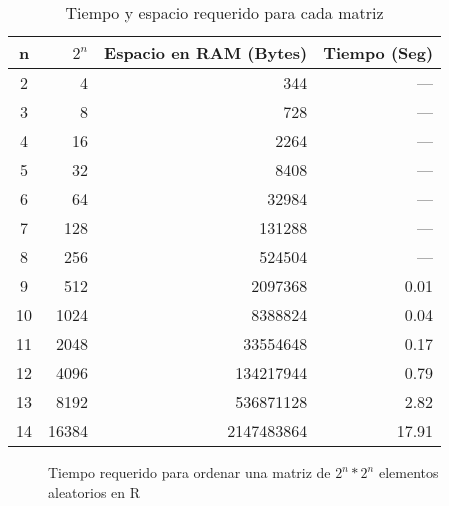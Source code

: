 \documentclass{article}
\begin{document}
\begin{table}[h]
\centering
\caption{Tiempo y espacio requerido para cada matriz}
\label{tabla 1}
\begin{tabular}{|c|r|r|r|}
\hline
n  & $2^n$ & Espacio en RAM (Bytes) & Tiempo (Seg) \\ \hline
2  & 4                    & 344                    & ---            \\ \hline
3  & 8                    & 728                    & ---            \\ \hline
4  & 16                   & 2264                   & ---            \\ \hline
5  & 32                   & 8408                   & ---            \\ \hline
6  & 64                   & 32984                  & ---            \\ \hline
7  & 128                  & 131288                 & ---            \\ \hline
8  & 256                  & 524504                 & ---            \\ \hline
9  & 512                  & 2097368                & 0.01         \\ \hline
10 & 1024                 & 8388824                & 0.04         \\ \hline
11 & 2048                 & 33554648               & 0.17         \\ \hline
12 & 4096                 & 134217944              & 0.79         \\ \hline
13 & 8192                 & 536871128              & 2.82         \\ \hline
14 & 16384                & 2147483864             & 17.91        \\ \hline
\end{tabular}

\end{table}
\begin{figure}
    \centering 
{}
\caption{Tiempo requerido para ordenar una matriz de $2^n * 2^n$ elementos  aleatorios en R}
    \label{grafica1}
\end{figure}
\end{document}

